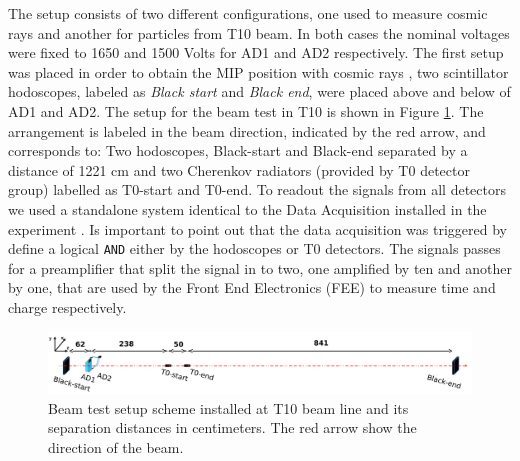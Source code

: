 The setup consists of two different configurations, one used to measure cosmic rays and another for particles from T10 beam. In both cases the nominal voltages were fixed to 1650 and 1500 Volts for AD1 and AD2 respectively.
The first setup was placed in order to obtain the MIP position with cosmic rays \cite{cosmicsAD}, two scintillator hodoscopes, labeled as \textit{Black start} and \textit{Black end}, were placed above and below of AD1 and AD2. The setup for the beam test in T10 is shown in Figure \ref{figure:BeamSetup}. The arrangement is labeled in the beam direction, indicated by the red arrow, and corresponds to: Two hodoscopes, Black-start and Black-end separated by a distance of 1221 cm and two Cherenkov radiators (provided by T0 detector group) labelled as T0-start and T0-end.
%
To readout the signals from all detectors we used a standalone system identical to the Data Acquisition installed in the experiment \cite{ADNote}. 
%
%
Is important to point out that the data acquisition was triggered by define a logical \texttt{AND} either by the hodoscopes or T0 detectors. The signals passes for a preamplifier that split the signal in to two, one amplified by ten and another by one, that are used by the Front End Electronics (FEE) to measure time and charge respectively.
%
\begin{figure}[ht!]
	\begin{center}
		\includegraphics[scale=0.45]{images/BeamTest-Setup_v4.pdf}
		\caption{Beam test setup scheme installed at T10 beam line and its separation distances in centimeters. 
			The red arrow show the direction of the beam. 
		}
		\label{figure:BeamSetup}
	\end{center}
\end{figure}
%